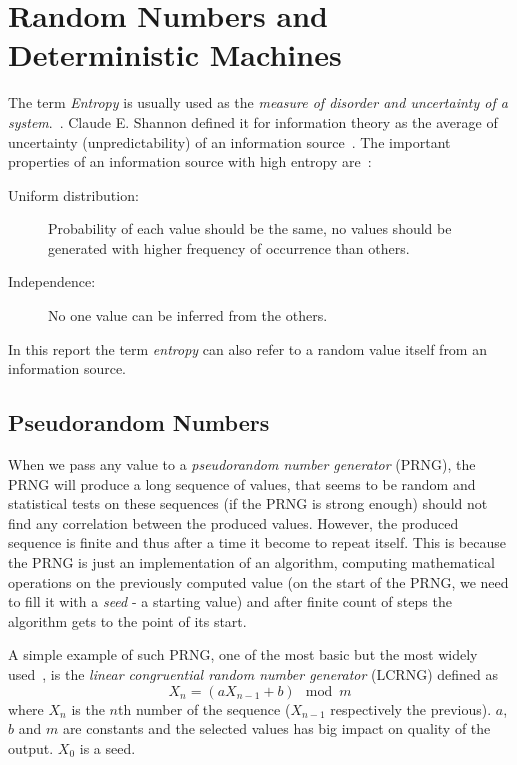 \chapter{Random Numbers and Deterministic Machines}\label{chap:randomNumbers}
\par{
The term {\em Entropy} is usually used  as the {\em measure of disorder 
and uncertainty of a system}.~\cite{Entrophy}. Claude E. Shannon defined it 
for information theory as the average of uncertainty (unpredictability) 
of an information source~\cite[p.~396]{AMathematicalTheoryOfCommunication}. 
The important properties of an information source with high entropy 
are~\cite[p.~150]{CryptographyAndNetworkSecurity}: 
\begin{description}
 \item [Uniform distribution:] Probability of each value should be the same, 
 no values should be generated with higher frequency of occurrence than others.
 \item [Independence:] No one value can be inferred from the others.
\end{description}
}

\par{
In this report the term {\em entropy} can also refer to a random value itself 
from an information source. 
}

\par{
\section{Pseudorandom Numbers}
When we pass any value to a {\em pseudorandom number generator} (PRNG), 
the PRNG will produce a long sequence of values, that seems to be random 
and statistical tests on these sequences (if the PRNG is strong enough) 
should not find any correlation between the produced values. However, 
the produced sequence is finite and thus after a time it become to repeat itself. 
This is because the PRNG is just an implementation of an algorithm, computing 
mathematical operations on the previously computed value (on the start 
of the PRNG, we need to fill it with a {\em seed} - a starting value) 
and after finite count of steps the algorithm gets to the point of its start.
}

\par{
A simple example of such PRNG, one of the most basic but the most widely 
used~\cite[p.~151]{CryptographyAndNetworkSecurity}, 
is the {\em linear congruential random number generator} (LCRNG) defined as 
\begin{equation}\label{eq:LCRNG}
  X_n = (aX_{n-1} + b) \mod{m}
\end{equation}
where $X_n$ is the $n$th number of the sequence ($X_{n-1}$ respectively 
the previous). $a$, $b$ and $m$ are constants and the selected values 
has big impact on quality of the output. $X_0$ is a seed. 
}

